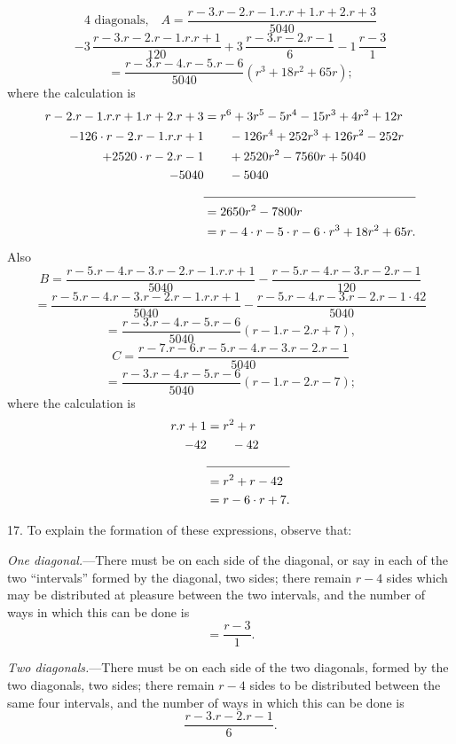 \documentclass[11pt]{article}
\begin{document}
\smallskip
\[
\text{4 diagonals,}\quad A=\frac{r-3.r-2.r-1.r.r+1.r+2.r+3}{5040}
\]
\[
-3\,\frac{r-3.r-2.r-1.r.r+1}{120}+3\,\frac{r-3.r-2.r-1}{6}-1\,\frac{r-3}{1}
\]
\[
=\frac{r-3.r-4.r-5.r-6}{5040}(r^{3}+18r^{2}+65r);
\]
where the calculation is
\[
\begin{aligned}
r-2.r-1.r.r+1.r+2.r+3 &= r^{6}+3r^{5}-5r^{4}-15r^{3}+4r^{2}+12r\\
-126\cdot r-2.r-1.r.r+1 &\hspace{2em} -126r^{4}+252r^{3}+126r^{2}-252r\\
+2520\cdot r-2.r-1 &\hspace{2em} +2520r^{2}-7560r+5040\\
-5040 &\hspace{2em} -5040\\
\cline{2-2}
       &= 2650r^{2}-7800r\\
       &= r-4\cdot r-5\cdot r-6\cdot r^{3}+18r^{2}+65r.
\end{aligned}
\]
Also
\[
B=\frac{r-5.r-4.r-3.r-2.r-1.r.r+1}{5040}-\frac{r-5.r-4.r-3.r-2.r-1}{120}
\]
\[
=\frac{r-5.r-4.r-3.r-2.r-1.r.r+1}{5040}-\frac{r-5.r-4.r-3.r-2.r-1\cdot 42}{5040}
\]
\[
=\frac{r-3.r-4.r-5.r-6}{5040}(r-1.r-2.r+7),
\]
\[
C=\frac{r-7.r-6.r-5.r-4.r-3.r-2.r-1}{5040}
\]
\[
=\frac{r-3.r-4.r-5.r-6}{5040}(r-1.r-2.r-7);
\]
where the calculation is
\[
\begin{aligned}
r.r+1 &= r^{2}+r\\
-42  &\hspace{2em} -42\\
\cline{2-2}
       &= r^{2}+r-42\\
       &= r-6\cdot r+7.
\end{aligned}
\]

\hspace{1em} 17. To explain the formation of these expressions, observe that:

\hspace{1em} \emph{One diagonal.}---There must be on each side of the
diagonal, or say in each of the two ``intervals'' formed by the diagonal, two
sides; there remain $r-4$ sides which may be distributed at pleasure between
the two intervals, and the number of ways in which this can be done is
\[
=\frac{r-3}{1}.
\]

\hspace{1em} \emph{Two diagonals.}---There must be on each side of the two
diagonals, formed by the two diagonals, two sides; there remain $r-4$ sides
to be distributed between the same four intervals, and the number of ways in
which this can be done is
\[
\frac{r-3.r-2.r-1}{6}.
\]
\end{document}
